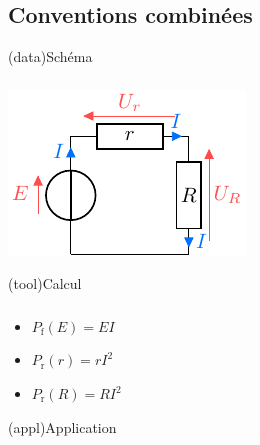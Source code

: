 \documentclass[../../main/main.tex]{subfiles}
\begin{document}
{\subsection{Conventions combinées}
\begin{tcbraster}[raster columns=7, raster equal height=rows]
    \begin{tcb}[raster multicolumn=2](data){Schéma}
        \subsubsection{}
        \vfill
        \begin{center}
            \includegraphics{convs_c}
        \end{center}
        \vfill
    \end{tcb}
    \begin{tcb}[raster multicolumn=2](tool){Calcul}
        \subsubsection{}
        \vfill
        \begin{itemize}[leftmargin=20pt]
            \item $P_{\text{f}}(E) = EI$
            \item $P_{\text{r}}(r) = rI^2$
            \item $P_{\text{r}}(R) = RI^2$
        \end{itemize}
        \vfill
    \end{tcb}
    \begin{tcb}[raster multicolumn=3](appl){Application}

\end{tcb}
\end{tcbraster}}
\end{document}
